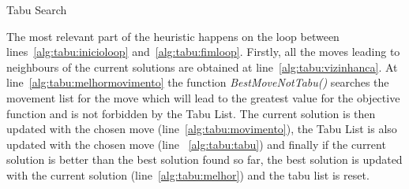 \begin{algorithm}
\caption{Tabu Search}
\label{alg:tabu}
\end{algorithm}

The most relevant part of the heuristic happens on the loop between lines~\ref{alg:tabu:inicioloop}
and~\ref{alg:tabu:fimloop}. Firstly, all the moves leading to neighbours of the current solutions are obtained at 
line~\ref{alg:tabu:vizinhanca}. At line~\ref{alg:tabu:melhormovimento} the function \textit{BestMoveNotTabu()} searches
the movement list for the move which will lead to the greatest value for the objective function and is not forbidden
by the Tabu List. The current solution is then updated with the chosen move (line~\ref{alg:tabu:movimento}), 
the Tabu List is also updated with the chosen move (line ~\ref{alg:tabu:tabu}) 
and finally if the current solution is better than the best solution found so far, the best solution is updated 
with the current solution (line~\ref{alg:tabu:melhor}) and the tabu list is reset.

